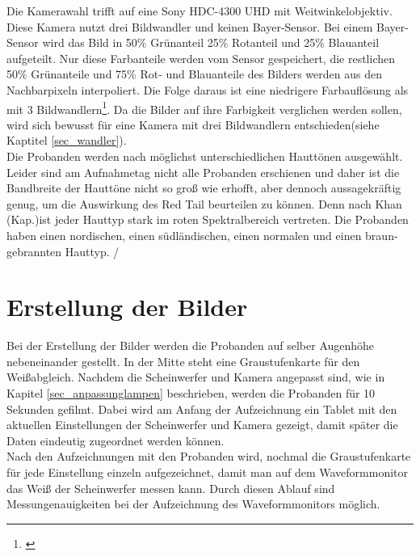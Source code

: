 Die Kamerawahl trifft auf eine Sony HDC-4300 UHD mit Weitwinkelobjektiv. Diese Kamera nutzt drei Bildwandler und keinen Bayer-Sensor. Bei einem Bayer-Sensor wird das Bild in 50\% Grünanteil 25\% Rotanteil und 25\% Blauanteil aufgeteilt. Nur diese Farbanteile werden vom Sensor gespeichert, die restlichen 50\% Grünanteile und 75\% Rot- und Blauanteile des Bilders werden aus den Nachbarpixeln interpoliert. Die Folge daraus ist eine niedrigere Farbauflösung als mit 3 Bildwandlern\footnote{\cite[380-381]{schmidt}}. Da die Bilder auf ihre Farbigkeit verglichen werden sollen, wird sich bewusst für eine Kamera mit drei Bildwandlern entschieden(siehe Kaptitel \ref{sec_wandler}).\\

Die Probanden werden nach möglichst unterschiedlichen Hauttönen ausgewählt. Leider sind am Aufnahmetag nicht alle Probanden erschienen und daher ist die Bandbreite der Hauttöne nicht so groß wie erhofft, aber dennoch aussagekräftig genug, um die Auswirkung des Red Tail beurteilen zu können. Denn nach Khan (Kap.)ist jeder Hauttyp stark im roten Spektralbereich vertreten. Die Probanden haben einen nordischen, einen südländischen, einen normalen und einen braun-gebrannten Hauttyp. /%

 
\section{Erstellung der Bilder}
\label{sec_erstellungbilder}
Bei der Erstellung der Bilder werden die Probanden auf selber Augenhöhe nebeneinander gestellt. In der Mitte steht eine Graustufenkarte für den Weißabgleich. Nachdem die Scheinwerfer und Kamera angepasst sind, wie in Kapitel \ref{sec_anpassunglampen} beschrieben, werden die Probanden für 10 Sekunden gefilmt. Dabei wird am Anfang der Aufzeichnung ein Tablet mit den aktuellen Einstellungen der Scheinwerfer und Kamera gezeigt, damit später die Daten eindeutig zugeordnet werden können.\\
Nach den Aufzeichnungen mit den Probanden wird, nochmal die Graustufenkarte für jede Einstellung einzeln aufgezeichnet, damit man auf dem Waveformmonitor das Weiß der Scheinwerfer messen kann. Durch diesen Ablauf sind Messungenauigkeiten bei der Aufzeichnung des Waveformmonitors möglich. 

